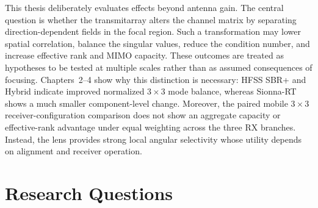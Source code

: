 

This thesis deliberately evaluates effects beyond antenna gain. The central question is whether the transmitarray alters the channel matrix by separating direction-dependent fields in the focal region. Such a transformation may lower spatial correlation, balance the singular values, reduce the condition number, and increase effective rank and MIMO capacity. These outcomes are treated as hypotheses to be tested at multiple scales rather than as assumed consequences of focusing. Chapters~2--4 show why this distinction is necessary: HFSS SBR+ and Hybrid indicate improved normalized $3\times3$ mode balance, whereas Sionna-RT shows a much smaller component-level change. Moreover, the paired mobile $3\times3$ receiver-configuration comparison does not show an aggregate capacity or effective-rank advantage under equal weighting across the three RX branches. Instead, the lens provides strong local angular selectivity whose utility depends on alignment and receiver operation.

\section{Research Questions}

